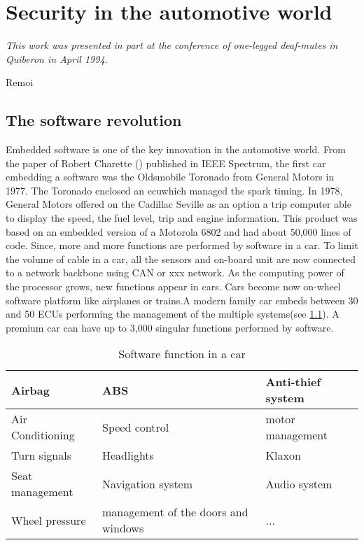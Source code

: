 
\chapter{Security in the automotive world} \label{CHAP2}
\smallskip
\hfill
\begin{minipage}[b]{8cm}
{\it This work was presented in part at the conference of one-legged deaf-mutes in Quiberon in April 1994.}
\end{minipage}
\begin{flushright} Remoi \end{flushright}
\vskip 2cm

\section {The software revolution}
\medskip
{\Huge E}mbedded software is one of the key innovation in the automotive world. From the paper of
 Robert Charette (\cite{Cha2009}) published in IEEE Spectrum, the first car embedding a software was the Oldsmobile Toronado from General Motors in 1977. The Toronado enclosed an \gls{ecu}\@ which managed the spark timing. In 1978, General Motors offered on the Cadillac Seville as an option a trip computer able to display the speed, the fuel level, trip and engine information. This product was based on an embedded version of a Motorola 6802 and had about 50,000 lines of code. Since, more and more functions are performed by software in a car. To limit the volume of cable in a car, all the sensors and on-board unit are now connected to a network backbone using CAN or xxx network. As the computing power of the processor grows, new functions appear in cars. Cars become now on-wheel software platform like airplanes or trains.A modern family car embeds between 30 and 50 ECUs performing the management of the multiple systems(see \ref{tab:soft}). A premium car can have up to 3,000 singular functions performed by software.   

\FloatBarrier
\begin{table}
\centering
\begin{tabular}{| l | l | l |}
\hline
Airbag & ABS & Anti-thief system \\
\hline
Air Conditioning & Speed control & motor management \\
\hline
Turn signals & Headlights & Klaxon \\
\hline
Seat management & Navigation system & Audio system\\
\hline
Wheel pressure & management of the doors and windows & ... \\
\hline
\end{tabular}
\caption{Software function in a car}
\label{tab:soft}
\end{table}
\FloatBarrier


